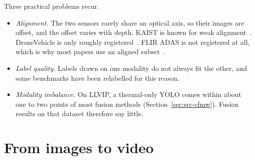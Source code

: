 Three practical problems recur.
\begin{itemize}
  \item \emph{Alignment.} The two sensors rarely share an optical axis, so
        their images are offset, and the offset varies with depth. KAIST is
        known for weak alignment~\citep{hwang2015kaist,li2018kaistsanitized}.
        DroneVehicle is only roughly registered~\citep{sun2022dronevehicle}.
        FLIR ADAS is not registered at all, which is why most papers use an
        aligned subset~\citep{zhang2020cfr}.
  \item \emph{Label quality.} Labels drawn on one modality do not always fit
        the other, and some benchmarks have been relabelled for this reason.
  \item \emph{Modality imbalance.} On LLVIP, a thermal-only YOLO comes within
        about one to two points of most fusion methods (Section~\ref{sec:src-cfmw}).
        Fusion results on that dataset therefore say little.
\end{itemize}



\section{From images to video}
\label{sec:video}

